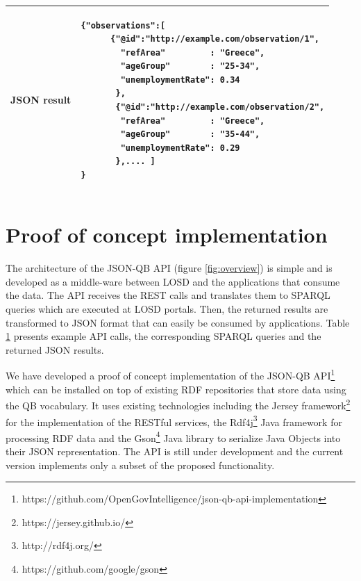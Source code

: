 \documentclass{llncs}
\begin{document}
\begin{table}
\begin{tabular}{|l|l|}
JSON result &
\begin{minipage}[t]{4.5in}
 \begin{verbatim} 
{"observations":[
      {"@id":"http://example.com/observation/1",
        "refArea"         : "Greece",
        "ageGroup"        : "25-34",
        "unemploymentRate": 0.34
       },
       {"@id":"http://example.com/observation/2",
        "refArea"         : "Greece",
        "ageGroup"        : "35-44",
        "unemploymentRate": 0.29
       },.... ]
}     
\end{verbatim}
\end{minipage}\\\hline


\end{tabular}
\label{tbl:apiexamplecall}
\end{table}


\section{Proof of concept implementation}\label{sec:solution}

The architecture of the JSON-QB API (figure \ref{fig:overview}) is simple and is developed as a middle-ware between LOSD and the applications that consume the data. The API receives the REST calls and translates them to SPARQL queries which are executed at LOSD portals. Then, the returned results are transformed to JSON format that can easily be consumed by applications. Table \ref{tbl:apiexamplecall} presents example API calls, the corresponding SPARQL queries and the returned JSON results.

We have developed a proof of concept implementation of the JSON-QB API\footnote{https://github.com/OpenGovIntelligence/json-qb-api-implementation} which can be installed on top of existing  RDF repositories that store data using the QB vocabulary. It uses existing technologies including the Jersey framework\footnote{https://jersey.github.io/} for the implementation of the RESTful services, the Rdf4j\footnote{http://rdf4j.org/} Java framework for processing RDF data and the Gson\footnote{https://github.com/google/gson} Java library to serialize Java Objects into their JSON representation. The API is still under development and the current version implements only a subset of the proposed functionality.
\end{document}
